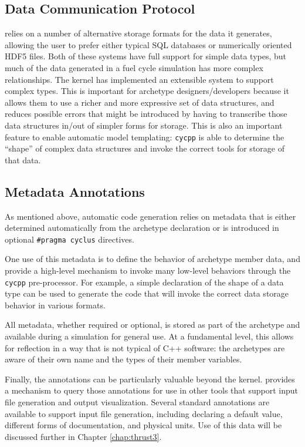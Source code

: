 \subsection{Data Communication Protocol}

\Cyclus relies on a number of alternative storage formats for the data it
generates, allowing the user to prefer either typical \gls{SQL} databases or
numerically oriented \gls{HDF5} files.  Both of these systems have full
support for simple data types, but much of the data generated in a fuel cycle
simulation has more complex relationships.  The \Cyclus kernel has implemented
an extensible system to support complex types.  This is important for
archetype designers/developers because it allows them to use a richer and more
expressive set of data structures, and reduces possible errors that might be
introduced by having to transcribe those data structures in/out of simpler
forms for storage.  This is also an important feature to enable automatic
model templating: \texttt{cycpp} is able to determine the ``shape'' of complex
data structures and invoke the correct tools for storage of that data.

\subsection{Metadata Annotations}\label{sec:metadata}

As mentioned above, automatic code generation relies on metadata that is
either determined automatically from the archetype declaration or is
introduced in optional \texttt{\#pragma cyclus} directives.

One use of this metadata is to define the behavior of archetype member data,
and provide a high-level mechanism to invoke many low-level behaviors through
the \texttt{cycpp} pre-processor.  For example, a simple declaration of the
shape of a data type can be used to generate the code that will invoke the
correct data storage behavior in various formats.

All metadata, whether required or optional, is stored as part of the archetype
and available during a \Cyclus simulation for general use.  At a fundamental
level, this allows for reflection in a way that is not typical of C++
software: the archetypes are aware of their own name and the types of their
member variables.

Finally, the annotations can be particularly valuable beyond the \Cyclus
kernel.  \Cyclus provides a mechanism to query those annotations for use in
other tools that support input file generation and output visualization.
Several standard annotations are available to support input file generation,
including declaring a default value, different forms of documentation, and
physical units.  Use of this data will be discussed further in Chapter
\ref{chap:thrust3}.

